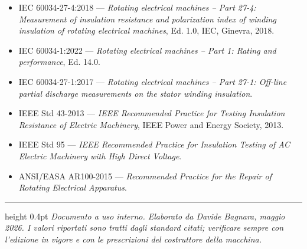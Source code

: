 \documentclass[a4paper,11pt]{article}
\begin{document}
\begin{itemize}
  \item IEC 60034-27-4:2018 — \emph{Rotating electrical machines -- Part 27-4: Measurement of insulation resistance and polarization index of winding insulation of rotating electrical machines}, Ed. 1.0, IEC, Ginevra, 2018.
  \item IEC 60034-1:2022 — \emph{Rotating electrical machines -- Part 1: Rating and performance}, Ed. 14.0.
  \item IEC 60034-27-1:2017 — \emph{Rotating electrical machines -- Part 27-1: Off-line partial discharge measurements on the stator winding insulation}.
  \item IEEE Std 43-2013 — \emph{IEEE Recommended Practice for Testing Insulation Resistance of Electric Machinery}, IEEE Power and Energy Society, 2013.
  \item IEEE Std 95 — \emph{IEEE Recommended Practice for Insulation Testing of AC Electric Machinery with High Direct Voltage}.
  \item ANSI/EASA AR100-2015 — \emph{Recommended Practice for the Repair of Rotating Electrical Apparatus}.
\end{itemize}

\vspace{8mm}
\hrule height 0.4pt
\vspace{3mm}
{\small\textit{Documento a uso interno. Elaborato da Davide Bagnara, maggio 2026.
I valori riportati sono tratti dagli standard citati; verificare sempre con l'edizione in vigore e con le prescrizioni del costruttore della macchina.}}
\end{document}
